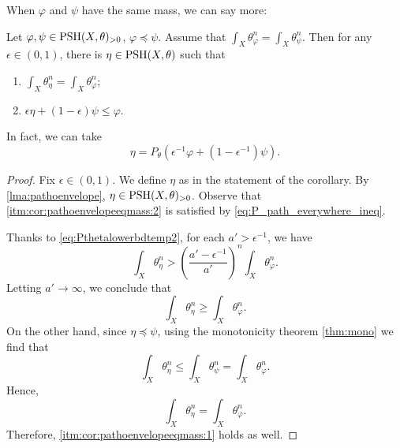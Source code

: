 When $\varphi$ and $\psi$ have the same mass, we can say more:
\begin{corollary}\label{cor:pathoenvelopeeqmass}
    Let $\varphi,\psi\in \mathrm{PSH}(X,\theta)_{>0}$, $\varphi\preceq \psi$. Assume that $\int_X \theta_{\varphi}^n=\int_X \theta_{\psi}^n$. Then for any $\epsilon\in (0,1)$, there is $\eta\in \mathrm{PSH}(X,\theta)$ such that
    \begin{enumerate}
        \item\label{itm:cor:pathoenvelopeeqmass:1} $\int_X \theta_{\eta}^n=\int_X \theta_{\varphi}^n$;
        \item\label{itm:cor:pathoenvelopeeqmass:2} $\epsilon\eta+(1-\epsilon)\psi\leq \varphi$.
    \end{enumerate}
    In fact, we can take
    \[
        \eta=P_{\theta}\left(\epsilon^{-1}\varphi+(1-\epsilon^{-1})\psi\right).
    \]
\end{corollary}

\begin{proof}
    Fix $\epsilon \in (0,1)$. We define $\eta$ as in the statement of the corollary. By \cref{lma:pathoenvelope}, $\eta\in \mathrm{PSH}(X,\theta)_{>0}$. Observe that \ref{itm:cor:pathoenvelopeeqmass:2} is satisfied by \eqref{eq:P_path_everywhere_ineq}.

    Thanks to \eqref{eq:Pthetalowerbdtemp2}, for each $a'>\epsilon^{-1}$, we have
    \[
    \int_X \theta_{\eta}^n>\left(\frac{a'-\epsilon^{-1}}{a'}\right)^n\int_X \theta_{\varphi}^n.
    \]
    Letting $a'\to\infty$, we conclude that
    \[
    \int_X \theta_{\eta}^n\geq \int_X \theta_{\varphi}^n.
    \]
    On the other hand, since $\eta\preceq \psi$, using the monotonicity theorem \cref{thm:mono} we find that
    \[
    \int_X \theta_{\eta}^n\leq \int_X \theta_{\psi}^n= \int_X \theta_{\varphi}^n.
    \]
    Hence,
    \[
    \int_X \theta_{\eta}^n= \int_X \theta_{\varphi}^n.
    \]
    Therefore, \ref{itm:cor:pathoenvelopeeqmass:1} holds as well.
\end{proof}



